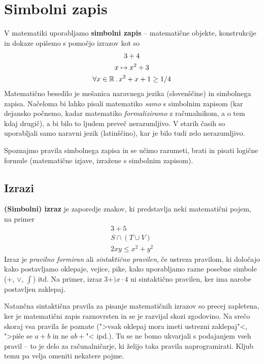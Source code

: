 \chapter{Simbolni zapis}

V matematiki uporabljamo \textbf{simbolni zapis} -- matematične objekte, konstrukcije in dokaze opišemo s pomočjo izrazov kot so
%
\begin{gather*}
  3 + 4\\
  x \mapsto x^2 + 3\\
  \forall x \in \mathbb{R} \,.\, x^2 + x + 1 \geq 1/4
\end{gather*}
%
Matematično besedilo je mešanica naravnega jezika (slovenščine) in simbolnega zapisa. Načeloma bi lahko pisali matematiko \emph{samo} s simbolnim zapisom (kar dejansko počnemo, kadar matematiko \emph{formaliziramo} z računalnikom, a o tem kdaj drugič), a bi bilo to ljudem preveč nerazumljivo. V starih časih so uporabljali samo naravni jezik (latinščino), kar je bilo tudi zelo nerazumljivo.

Spoznajmo pravila simbolnega zapisa in se učimo razumeti, brati in pisati logične formule (matematične izjave, izražene s simbolnim zapisom).


\section{Izrazi}

\textbf{(Simbolni) izraz} je zaporedje znakov, ki predstavlja neki matematični pojem, na primer
%
\begin{gather*}
  3 + 5 \\
  S \cap (T \cup V) \\
  2 x y \leq x^2 + y^2
\end{gather*}
%
Izraz je \emph{pravilno formiran} ali \emph{sintaktično pravilen}, če ustreza pravilom, ki določajo kako postavljamo oklepaje,
vejice, pike, kako uporabljamo razne posebne simbole ($+$, $\lor$, $\int$) itd. Na primer, izraz $3 + ) x \cdot 4$ ni sintaktično
pravilen, ker ima narobe postavljen zaklepaj.

Natančna sintaktična pravila za pisanje matematičnih izrazov so precej zapletena, ker je matematični zapis raznovrsten
in se je razvijal skozi zgodovino. Na srečo skoraj vsa pravila že poznate (">vsak oklepaj mora imeti ustrezni zaklepaj"<,
">piše se $a + b$ in ne $a b +$"< ipd.). Tu se ne bomo ukvarjali s podajanjem vseh pravil -- to je delo za računalničarje,
ki želijo taka pravila naprogramirati. Kljub temu pa velja omeniti nekatere pojme.


